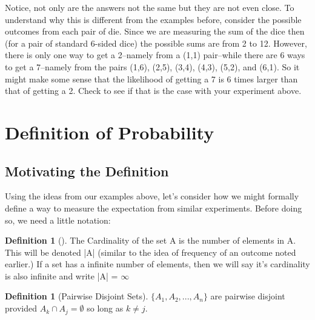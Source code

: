 \documentclass[10pt,]{book}
\theoremstyle{plain}
\theoremstyle{definition}
\newtheorem{definition}[theorem]{Definition}
\theoremstyle{definition}
\numberwithin{equation}{section}
\begin{document}
\par
Notice, not only are the answers not the same but they are not even close. To understand why this 
	is different from the examples before, consider the possible outcomes from each pair of die. Since we
	are measuring the sum of the dice then (for a pair of standard 6-sided dice) the possible sums are from 
	2 to 12. However, there is only one way to get a 2--namely from a (1,1) pair--while there are 6 ways to get
	a 7--namely from the pairs (1,6), (2,5), (3,4), (4,3), (5,2), and (6,1). So it might make some sense
	that the likelihood of getting a 7 is 6 times larger than that of getting a 2. Check to see if that
	is the case with your experiment above.%
\typeout{************************************************}
\typeout{************************************************}
\section[Definition of Probability]{Definition of Probability}\label{section-18}
\typeout{************************************************}
\typeout{************************************************}
\subsection[Motivating the Definition]{Motivating the Definition}\label{ProbabilityDefns}
Using the ideas from our examples above, let's consider how we might formally define a way
	to measure the expectation from similar experiments.  Before doing so, we need a little notation:%
\begin{definition}[]\label{definition-20}
The Cardinality of the set A is the number of elements in A. This will be denoted |A| (similar
		to the idea of frequency of an outcome noted earlier.) If a set has
		a infinite number of elements, then we will say it's cardinality is also infinite and 
		write |A| = \(\infty\)\end{definition}
\begin{definition}[Pairwise Disjoint Sets]\label{definition-21}
\( \{ A_1, A_2, ... , A_n \}\) are pairwise disjoint provided \(A_k \cap A_j = \emptyset\) so long as \(k \ne j\).
		\end{definition}
\par
\end{document}
